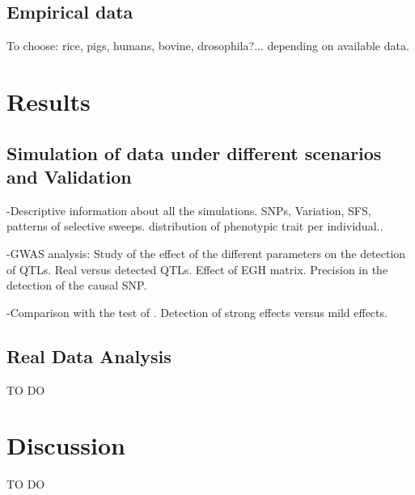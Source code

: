 \documentclass[a4paper,11pt]{article}
\newcommand{\beginsupplement}{%
        \setcounter{table}{0}
        \renewcommand{\thetable}{S\arabic{table}}%
        \setcounter{figure}{0}
        \renewcommand{\thefigure}{S\arabic{figure}}%
}
\begin{document}
\subsection{Empirical data}
To choose: rice, pigs, humans, bovine, drosophila?... depending on available data.

\section{Results}
\subsection{Simulation of data under different scenarios and Validation}
\noindent -Descriptive information about all the simulations. SNPs, Variation, SFS, patterns of selective sweeps. distribution of phenotypic trait per individual..\par
\noindent -GWAS analysis: Study of the effect of the different parameters on the detection of QTLs. Real versus detected QTLs. Effect of EGH matrix. Precision in the detection of the causal SNP.\par
\noindent -Comparison with the test of \citet{Beissinger:2018aa}. Detection of strong effects versus mild effects. \par

\subsection{Real Data Analysis}
TO DO

\section{Discussion}
TO DO




\newpage
\beginsupplement
\end{document}
